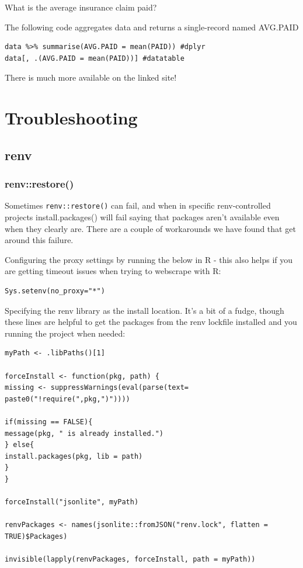 \documentclass[
  12pt,
]{article}
\begin{document}
What is the average insurance claim paid?

The following code aggregates data and returns a single-record named
AVG.PAID

\begin{verbatim}
data %>% summarise(AVG.PAID = mean(PAID)) #dplyr
data[, .(AVG.PAID = mean(PAID))] #datatable
\end{verbatim}

There is much more available on the linked site!

\newpage

\hypertarget{troubleshooting}{%
\section{Troubleshooting}\label{troubleshooting}}

\hypertarget{renv}{%
\subsection{renv}\label{renv}}

\hypertarget{renvrestore}{%
\subsubsection{renv::restore()}\label{renvrestore}}

Sometimes \texttt{renv::restore()} can fail, and when in specific
renv-controlled projects install.packages() will fail saying that
packages aren't available even when they clearly are. There are a couple
of workarounds we have found that get around this failure.

Configuring the proxy settings by running the below in R - this also
helps if you are getting timeout issues when trying to webscrape with R:

\begin{verbatim}
Sys.setenv(no_proxy="*") 
\end{verbatim}

Specifying the renv library as the install location. It's a bit of a
fudge, though these lines are helpful to get the packages from the renv
lockfile installed and you running the project when needed:

\begin{verbatim}
myPath <- .libPaths()[1]

forceInstall <- function(pkg, path) {
missing <- suppressWarnings(eval(parse(text= paste0("!require(",pkg,")"))))

if(missing == FALSE){
message(pkg, " is already installed.")
} else{
install.packages(pkg, lib = path)
}
}

forceInstall("jsonlite", myPath)

renvPackages <- names(jsonlite::fromJSON("renv.lock", flatten = TRUE)$Packages)

invisible(lapply(renvPackages, forceInstall, path = myPath))
\end{verbatim}
\end{document}
